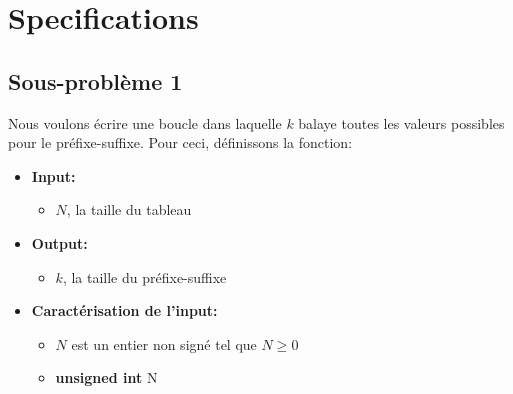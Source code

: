 \section{Specifications}\label{specifications}

\subsection{Sous-problème 1}
Nous voulons écrire une boucle dans laquelle $k$ balaye toutes les valeurs
possibles pour le préfixe-suffixe. Pour ceci, définissons la fonction:
\begin{itemize}
   \item \textbf{Input:}
      \begin{itemize}
         \item $N$, la taille du tableau
      \end{itemize}
   \item \textbf{Output:}
      \begin{itemize}
         \item $k$, la taille du préfixe-suffixe
      \end{itemize}
   \item \textbf{Caractérisation de l'input:}
      \begin{itemize}
         \item $N$ est un entier non signé tel que $N \geq 0$
         \item \textbf{unsigned int} N
      \end{itemize}
\end{itemize}

